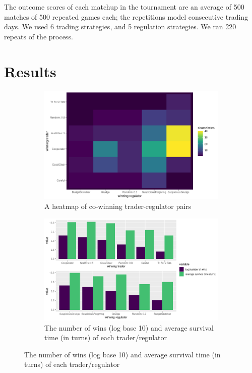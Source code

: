 \documentclass{article}
\begin{document}
The outcome scores of each matchup in the tournament are an average of 500 matches of 500 repeated games each; the repetitions model consecutive trading days. We used 6 trading strategies, and 5 regulation strategies. We ran 220 repeats of the process.

\section{Results}
\begin{figure}[!h]
  \begin{subfigure}[c]{0.5\textwidth}
    \includegraphics[width=\textwidth]{heatmap.png}
    \caption{A heatmap of co-winning trader-regulator pairs}
    \label{fig:f1}
  \end{subfigure}
  \hfill
  \begin{subfigure}[c]{0.5\textwidth}
    \includegraphics[width=\textwidth]{barplot.png}
    \caption{The number of wins (log base 10) and average survival time (in turns) of each trader/regulator}
    \label{fig:f2}
  \end{subfigure}
\end{figure}
\end{document}
